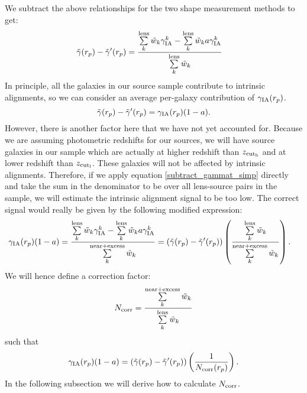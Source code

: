 \documentclass[onecolumn,amsmath,aps,fleqn, superscriptaddress]{revtex4}
\begin{document}
We subtract the above relationships for the two shape measurement methods to get:
\begin{align}
\tilde{\gamma}(r_p) - \tilde{\gamma}^\prime(r_p) &= \frac{\sum\limits_{k}^{\rm lens} \tilde{w}_k \gamma_{\rm IA}^k - \sum\limits_{k}^{\rm lens} \tilde{w}_k a \gamma_{\rm IA}^k}{\sum\limits_{k}^{\rm lens} \tilde{w}_k} 
\label{subtract_gammat}
\end{align}
In principle, all the galaxies in our source sample contribute to intrinsic alignments, so we can consider an average per-galaxy contribution of $\gamma_{\rm IA}(r_p)$.
\begin{equation}
\tilde{\gamma}(r_p) - \tilde{\gamma}^\prime(r_p) = \gamma_{\rm IA}(r_p)(1-a).
\label{subtract_gammat_simp}
\end{equation}
However, there is another factor here that we have not yet accounted for. Because we are assuming photometric redshifts for our sources, we will have source galaxies in our sample which are actually at higher redshift than $z_{\rm cut_h}$ and at lower redshift than $z_{\rm cut_l}$. These galaxies will not be affected by intrinsic alignments. Therefore, if we apply equation \ref{subtract_gammat_simp} directly and take the sum in the denominator to be over all lens-source pairs in the sample, we will estimate the intrinsic alignment signal to be too low. The correct signal would really be given by the following modified expression: 
\begin{align}
\gamma_{\rm IA}(r_p)(1-a)&= \frac{\sum\limits_{k}^{\rm lens} \tilde{w}_k \gamma_{\rm IA}^k - \sum\limits_{k}^{\rm lens} \tilde{w}_k a \gamma_{\rm IA}^k}{\sum\limits_{k}^{\rm near + excess} \tilde{w}_k} = \left(\tilde{\gamma}(r_p) - \tilde{\gamma}^\prime(r_p)\right) \left(\frac{\sum\limits_{k}^{\rm lens} \tilde{w}_k}{\sum\limits_{k}^{\rm near + excess} \tilde{w}_k}\right).
\label{subtract_gammat_correct}
\end{align}
We will hence define a correction factor:
\begin{equation}
N_{\rm corr} = \frac{\sum\limits_{k}^{\rm near + excess} \tilde{w}_k}{\sum\limits_{k}^{\rm lens} \tilde{w}_k}
\label{Ncorr1}
\end{equation}
such that
\begin{equation}
\gamma_{\rm IA}(r_p)(1-a) = \left(\tilde{\gamma}(r_p) - \tilde{\gamma}^\prime(r_p)\right)\left(\frac{1}{N_{\rm corr}(r_p)}\right).
\label{IAsol1}
\end{equation}
In the following subsection we will derive how to calculate $N_{\rm corr}$.
\end{document}
